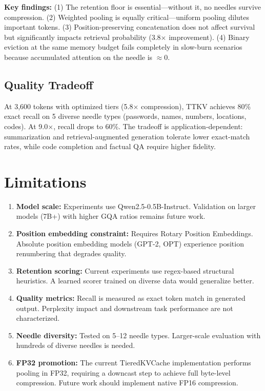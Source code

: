 \documentclass[11pt]{article}
\begin{document}
\textbf{Key findings:} (1) The retention floor is essential---without it, no needles survive compression. (2) Weighted pooling is equally critical---uniform pooling dilutes important tokens. (3) Position-preserving concatenation does not affect survival but significantly impacts retrieval probability (3.8$\times$ improvement). (4) Binary eviction at the same memory budget fails completely in slow-burn scenarios because accumulated attention on the needle is $\approx$0.

\subsection{Quality Tradeoff}

At 3,600 tokens with optimized tiers (5.8$\times$ compression), TTKV achieves 80\% exact recall on 5 diverse needle types (passwords, names, numbers, locations, codes). At 9.0$\times$, recall drops to 60\%. The tradeoff is application-dependent: summarization and retrieval-augmented generation tolerate lower exact-match rates, while code completion and factual QA require higher fidelity.

\section{Limitations}

\begin{enumerate}
\item \textbf{Model scale:} Experiments use Qwen2.5-0.5B-Instruct. Validation on larger models (7B+) with higher GQA ratios remains future work.
\item \textbf{Position embedding constraint:} Requires Rotary Position Embeddings. Absolute position embedding models (GPT-2, OPT) experience position renumbering that degrades quality.
\item \textbf{Retention scoring:} Current experiments use regex-based structural heuristics. A learned scorer trained on diverse data would generalize better.
\item \textbf{Quality metrics:} Recall is measured as exact token match in generated output. Perplexity impact and downstream task performance are not characterized.
\item \textbf{Needle diversity:} Tested on 5--12 needle types. Larger-scale evaluation with hundreds of diverse needles is needed.
\item \textbf{FP32 promotion:} The current TieredKVCache implementation performs pooling in FP32, requiring a downcast step to achieve full byte-level compression. Future work should implement native FP16 compression.
\end{enumerate}
\end{document}
